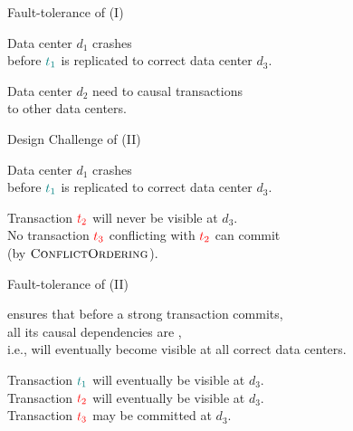 \begin{frame}{Fault-tolerance of \unistore{} (I)}
  \begin{center}
    Data center $d_{1}$ crashes \\[3pt]
    before $\textcolor{teal}{t_{1}}$ is replicated to correct data center $d_{3}$.

    \vspace{0.20cm}

    \pause
    Data center $d_{2}$ need to  causal transactions \\[3pt]
    to other data centers.
  \end{center}
\end{frame}

\begin{frame}{Design Challenge of \unistore{} (II)}
  \begin{center}
    Data center $d_{1}$ crashes \\[3pt]
    before $\textcolor{teal}{t_{1}}$ is replicated to correct data center $d_{3}$.

    \vspace{0.50cm}

    \pause
    \vspace{0.30cm}
    Transaction $\textcolor{red}{t_{2}}$ will never be visible at $d_{3}$. \\[3pt]
    No transaction $\textcolor{red}{t_{3}}$ conflicting with $\textcolor{red}{t_{2}}$ can commit \\
    (by $\textsc{ConflictOrdering}$).
  \end{center}
\end{frame}

\begin{frame}{Fault-tolerance of \unistore{} (II)}
  \begin{center}
    \unistore{} ensures that before a strong transaction commits, \\[3pt]
    all its causal dependencies are , \\[3pt]
    i.e., will eventually become visible at all correct data centers.

    \vspace{0.30cm}

    \pause
    Transaction $\textcolor{teal}{t_{1}}$ will eventually be visible at $d_{3}$. \\[3pt]
    Transaction $\textcolor{red}{t_{2}}$ will eventually be visible at $d_{3}$. \\[3pt]
    Transaction $\textcolor{red}{t_{3}}$ may be committed at $d_{3}$. \\[3pt]
  \end{center}
\end{frame}

